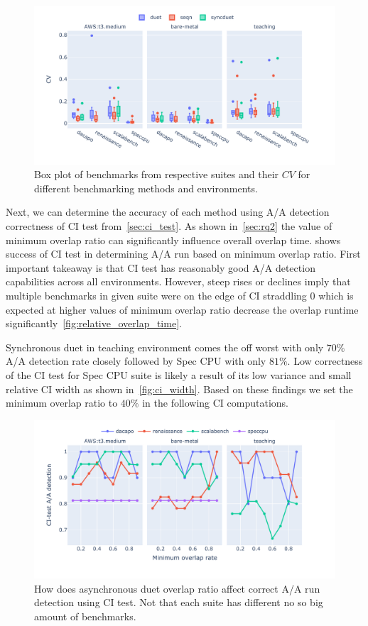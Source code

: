\begin{figure}
	\centering
	\includegraphics[width=1\linewidth]{./figures/cv.pdf}
	\caption{
		Box plot of benchmarks from respective suites and their $CV$ for different benchmarking methods and environments.
	}
	\label{fig:cv}
\end{figure}

Next, we can determine the accuracy of each method using A/A detection correctness of CI test from~\cref{sec:ci_test}.
As shown in~\cref{sec:rq2} the value of minimum overlap ratio can significantly influence overall overlap time.
 shows success of CI test in determining A/A run based on minimum overlap ratio.
First important takeaway is that CI test has reasonably good A/A detection capabilities across all environments.
However, steep rises or declines imply that multiple benchmarks in given suite were on the edge of CI straddling $0$ which is expected at higher values of minimum overlap ratio decrease the overlap runtime significantly~\ref{fig:relative_overlap_time}.

Synchronous duet in teaching environment comes the off worst with only $70\%$ A/A detection rate closely followed by Spec CPU with only $81\%$.
Low correctness of the CI test for Spec CPU suite is likely a result of its low variance and small relative CI width as shown in~\cref{fig:ci_width}.
Based on these findings we set the minimum overlap ratio to $40\%$ in the following CI computations.

\begin{figure}
	\centering
	\includegraphics[width=1\linewidth]{./figures/citest_aa_match_by_overlap.pdf}
	\caption{
		How does asynchronous duet overlap ratio affect correct A/A run detection using CI test.
		Not that each suite has different no so big amount of benchmarks.
	}
	\label{fig:citest_overlap_aa}
\end{figure}

